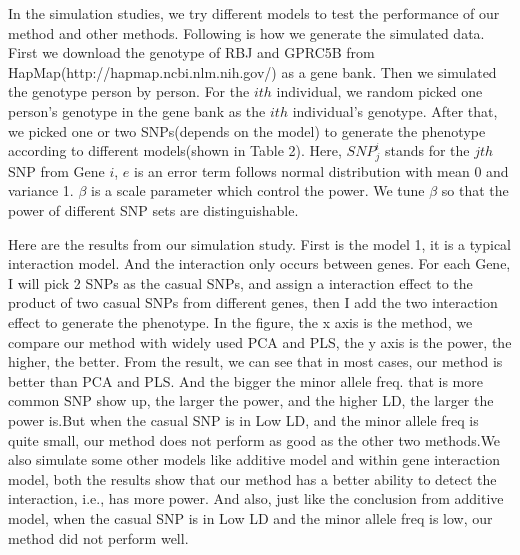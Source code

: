 \documentclass{article}
\begin{document}
        In the simulation studies, we try different models to test the performance of our method and other methods. Following is how we generate the simulated data. First we download the genotype of RBJ and GPRC5B from HapMap(http://hapmap.ncbi.nlm.nih.gov/) as a gene bank. Then we simulated the genotype person by person. For the $ith$ individual, we random picked one person's genotype in the gene bank as the $ith$ individual's genotype. After that, we picked one or two SNPs(depends on the model) to generate the phenotype according to different models(shown in Table 2). Here, $SNP^i_j$ stands for the $jth$ SNP from Gene $i$, $e$ is an error term follows normal distribution with mean 0 and variance 1. $\beta$ is a scale parameter which control the power. We tune $\beta$ so that the power of different SNP sets are distinguishable. 

        Here are the results from our simulation study. First is the model 1, it is a typical interaction model. And the interaction only occurs between genes. For each Gene, I will pick 2 SNPs as the casual SNPs, and assign a interaction effect to the product of two casual SNPs from different genes, then I add the two interaction effect to generate the phenotype. In the figure, the x axis is the method, we compare our method with widely used PCA and PLS, the y axis is the power, the higher, the better. From the result, we can see that in most cases, our method is better than PCA and PLS. And the bigger the minor allele freq. that is more common SNP show up, the larger the power, and the higher LD, the larger the power is.But when the casual SNP is in Low LD, and the minor allele freq is quite small, our method does not perform as good as the other two methods.We also simulate some other models like additive model and within gene interaction model, both the results show that our method has a better ability to detect the interaction, i.e., has more power. And also, just like the conclusion from additive model, when the casual SNP is in Low LD and the minor allele freq is low, our method did not perform well.
      
\end{document}
